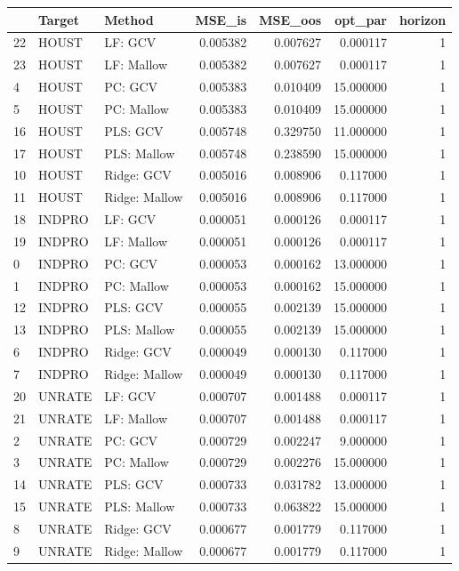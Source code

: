 \begin{tabular}{lllrrrr}
\toprule
{} &  Target &         Method &    MSE\_is &   MSE\_oos &    opt\_par &  horizon \\
\midrule
22 &   HOUST &        LF: GCV &  0.005382 &  0.007627 &   0.000117 &        1 \\
23 &   HOUST &     LF: Mallow &  0.005382 &  0.007627 &   0.000117 &        1 \\
4  &   HOUST &        PC: GCV &  0.005383 &  0.010409 &  15.000000 &        1 \\
5  &   HOUST &     PC: Mallow &  0.005383 &  0.010409 &  15.000000 &        1 \\
16 &   HOUST &       PLS: GCV &  0.005748 &  0.329750 &  11.000000 &        1 \\
17 &   HOUST &    PLS: Mallow &  0.005748 &  0.238590 &  15.000000 &        1 \\
10 &   HOUST &     Ridge: GCV &  0.005016 &  0.008906 &   0.117000 &        1 \\
11 &   HOUST &  Ridge: Mallow &  0.005016 &  0.008906 &   0.117000 &        1 \\
18 &  INDPRO &        LF: GCV &  0.000051 &  0.000126 &   0.000117 &        1 \\
19 &  INDPRO &     LF: Mallow &  0.000051 &  0.000126 &   0.000117 &        1 \\
0  &  INDPRO &        PC: GCV &  0.000053 &  0.000162 &  13.000000 &        1 \\
1  &  INDPRO &     PC: Mallow &  0.000053 &  0.000162 &  15.000000 &        1 \\
12 &  INDPRO &       PLS: GCV &  0.000055 &  0.002139 &  15.000000 &        1 \\
13 &  INDPRO &    PLS: Mallow &  0.000055 &  0.002139 &  15.000000 &        1 \\
6  &  INDPRO &     Ridge: GCV &  0.000049 &  0.000130 &   0.117000 &        1 \\
7  &  INDPRO &  Ridge: Mallow &  0.000049 &  0.000130 &   0.117000 &        1 \\
20 &  UNRATE &        LF: GCV &  0.000707 &  0.001488 &   0.000117 &        1 \\
21 &  UNRATE &     LF: Mallow &  0.000707 &  0.001488 &   0.000117 &        1 \\
2  &  UNRATE &        PC: GCV &  0.000729 &  0.002247 &   9.000000 &        1 \\
3  &  UNRATE &     PC: Mallow &  0.000729 &  0.002276 &  15.000000 &        1 \\
14 &  UNRATE &       PLS: GCV &  0.000733 &  0.031782 &  13.000000 &        1 \\
15 &  UNRATE &    PLS: Mallow &  0.000733 &  0.063822 &  15.000000 &        1 \\
8  &  UNRATE &     Ridge: GCV &  0.000677 &  0.001779 &   0.117000 &        1 \\
9  &  UNRATE &  Ridge: Mallow &  0.000677 &  0.001779 &   0.117000 &        1 \\
\bottomrule
\end{tabular}


